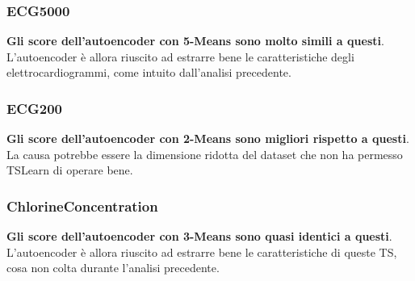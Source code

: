 \subsubsection{ECG5000}
\begin{center}
\end{center}
\textbf{Gli score dell'autoencoder con 5-Means sono molto simili a questi}. L'autoencoder è allora riuscito ad estrarre bene le caratteristiche degli elettrocardiogrammi, come intuito dall'analisi precedente.

\subsubsection{ECG200}
\begin{center}
\end{center}
\textbf{Gli score dell'autoencoder con 2-Means sono migliori rispetto a questi}. La causa potrebbe essere la dimensione ridotta del dataset che non ha permesso TSLearn di operare bene.

\subsubsection{ChlorineConcentration}
\begin{center}
\end{center}
\textbf{Gli score dell'autoencoder con 3-Means sono quasi identici a questi}. L'autoencoder è allora riuscito ad estrarre bene le caratteristiche di queste TS, cosa non colta durante l'analisi precedente.

